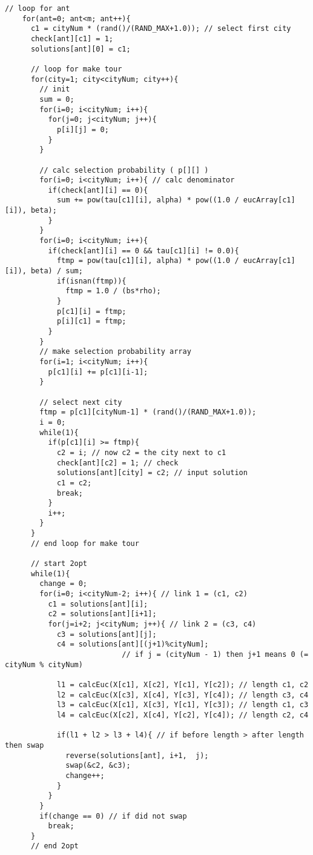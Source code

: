 \documentclass[a4j]{jsarticle}
\begin{document}
\begin{lstlisting}[caption=MMAS2opt.c, label=MMAS2opt, xleftmargin=1cm]
    // loop for ant
    for(ant=0; ant<m; ant++){
      c1 = cityNum * (rand()/(RAND_MAX+1.0)); // select first city
      check[ant][c1] = 1;
      solutions[ant][0] = c1;
      
      // loop for make tour
      for(city=1; city<cityNum; city++){
        // init
        sum = 0;
        for(i=0; i<cityNum; i++){
          for(j=0; j<cityNum; j++){
            p[i][j] = 0;
          }
        }

        // calc selection probability ( p[][] )
        for(i=0; i<cityNum; i++){ // calc denominator
          if(check[ant][i] == 0){
            sum += pow(tau[c1][i], alpha) * pow((1.0 / eucArray[c1][i]), beta);
          }
        }
        for(i=0; i<cityNum; i++){
          if(check[ant][i] == 0 && tau[c1][i] != 0.0){
            ftmp = pow(tau[c1][i], alpha) * pow((1.0 / eucArray[c1][i]), beta) / sum;
            if(isnan(ftmp)){
              ftmp = 1.0 / (bs*rho);
            }
            p[c1][i] = ftmp;
            p[i][c1] = ftmp;
          }
        }
        // make selection probability array
        for(i=1; i<cityNum; i++){
          p[c1][i] += p[c1][i-1];
        }

        // select next city
        ftmp = p[c1][cityNum-1] * (rand()/(RAND_MAX+1.0));
        i = 0;
        while(1){
          if(p[c1][i] >= ftmp){
            c2 = i; // now c2 = the city next to c1
            check[ant][c2] = 1; // check
            solutions[ant][city] = c2; // input solution
            c1 = c2;
            break;
          }
          i++;
        }
      }
      // end loop for make tour
      
      // start 2opt
      while(1){
        change = 0;
        for(i=0; i<cityNum-2; i++){ // link 1 = (c1, c2)
          c1 = solutions[ant][i];
          c2 = solutions[ant][i+1];
          for(j=i+2; j<cityNum; j++){ // link 2 = (c3, c4)
            c3 = solutions[ant][j];
            c4 = solutions[ant][(j+1)%cityNum]; 
                           // if j = (cityNum - 1) then j+1 means 0 (= cityNum % cityNum)
            
            l1 = calcEuc(X[c1], X[c2], Y[c1], Y[c2]); // length c1, c2
            l2 = calcEuc(X[c3], X[c4], Y[c3], Y[c4]); // length c3, c4
            l3 = calcEuc(X[c1], X[c3], Y[c1], Y[c3]); // length c1, c3
            l4 = calcEuc(X[c2], X[c4], Y[c2], Y[c4]); // length c2, c4
            
            if(l1 + l2 > l3 + l4){ // if before length > after length then swap
              reverse(solutions[ant], i+1,  j);
              swap(&c2, &c3);
              change++;
            }
          }
        }
        if(change == 0) // if did not swap
          break;
      }
      // end 2opt
      

\end{lstlisting}
\end{document}
